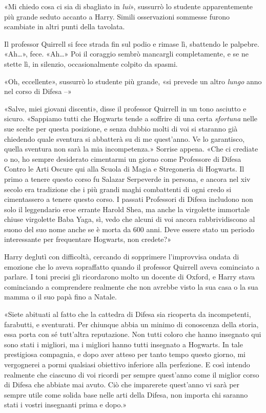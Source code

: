 «Mi chiedo cosa ci sia di sbagliato in \textit{lui}», sussurrò lo studente apparentemente più grande seduto accanto a Harry. Simili osservazioni sommesse furono scambiate in altri punti della tavolata.

Il professor Quirrell si fece strada fin sul podio e rimase lì, sbattendo le palpebre. «Ah…», fece. «Ah…» Poi il coraggio sembrò mancargli completamente, e se ne stette lì, in silenzio, occasionalmente colpito da spasmi.

«Oh, eccellente», sussurrò lo studente più grande, «si prevede un altro \textit{lungo} anno nel corso di Difesa –»

«Salve, miei giovani discenti», disse il professor Quirrell in un tono asciutto e sicuro. «Sappiamo tutti che Hogwarts tende a soffrire di una certa \textit{sfortuna} nelle sue scelte per questa posizione, e senza dubbio molti di voi si staranno già chiedendo quale sventura si abbatterà su di me quest’anno. Ve lo garantisco, quella sventura non sarà la mia incompetenza.» Sorrise appena. «Che ci crediate o no, ho sempre desiderato cimentarmi un giorno come Professore di Difesa Contro le Arti Oscure qui alla Scuola di Magia e Stregoneria di Hogwarts. Il primo a tenere questo corso fu Salazar Serpeverde in persona, e ancora nel xiv secolo era tradizione che i più grandi maghi combattenti di ogni credo si cimentassero a tenere questo corso. I passati Professori di Difesa includono non solo il leggendario eroe errante Harold Shea, ma anche la virgolette immortale chiuse virgolette Baba Yaga, sì, vedo che alcuni di voi ancora rabbrividiscono al suono del suo nome anche se è morta da 600 anni. Deve essere stato un periodo interessante per frequentare Hogwarts, non credete?»

Harry deglutì con difficoltà, cercando di sopprimere l’improvvisa ondata di emozione che lo aveva sopraffatto quando il professor Quirrell aveva cominciato a parlare. I toni precisi gli ricordarono molto un docente di Oxford, e Harry stava cominciando a comprendere realmente che non avrebbe visto la sua casa o la sua mamma o il suo papà fino a Natale.

«Siete abituati al fatto che la cattedra di Difesa sia ricoperta da incompetenti, farabutti, e sventurati. Per chiunque abbia un minimo di conoscenza della storia, essa porta con sé tutt’altra reputazione. Non tutti coloro che hanno insegnato qui sono stati i migliori, ma i migliori hanno tutti insegnato a Hogwarts. In tale prestigiosa compagnia, e dopo aver atteso per tanto tempo questo giorno, mi vergognerei a pormi qualsiasi obiettivo inferiore alla perfezione. E così intendo realmente che ciascuno di voi ricordi per sempre quest’anno come il miglior corso di Difesa che abbiate mai avuto. Ciò che imparerete quest’anno vi sarà per sempre utile come solida base nelle arti della Difesa, non importa chi saranno stati i vostri insegnanti prima e dopo.»


